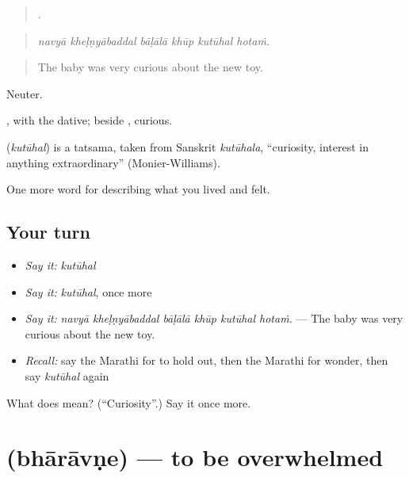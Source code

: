 \begin{quote}
     .
\end{quote}

\begin{quote}
\emph{navyā kheḷṇyābaddal bāḷālā khūp kutūhal hotaṁ.}
\end{quote}

\begin{quote}
The baby was very curious about the new toy.
\end{quote}

Neuter.

 , with the dative; beside , curious.

\begin{cousinweb}
\textbf{} (\emph{kutūhal}) is a tatsama, taken from Sanskrit \emph{kutūhala}, \textquotedblleft{}curiosity, interest in anything extraordinary\textquotedblright{} (Monier-Williams).
\end{cousinweb}

\begin{grammarlens}[title={What you've built}]
One more word for describing what you lived and felt.
\end{grammarlens}

\subsection*{Your turn}
\begin{itemize}
\raggedright
  \item \emph{Say it:} \emph{kutūhal}
  \item \emph{Say it:} \emph{kutūhal}, once more
  \item \emph{Say it:} \emph{navyā kheḷṇyābaddal bāḷālā khūp kutūhal hotaṁ.} — The baby was very curious about the new toy.
  \item \emph{Recall:} say the Marathi for to hold out, then the Marathi for wonder, then say \emph{kutūhal} again
\end{itemize}

\begin{tcolorbox}[breakable,colback=teal!4,colframe=teal!35!black,title={Before you move on}]
What does  mean? (\textquotedblleft{}Curiosity\textquotedblright{}.) Say it once more.
\end{tcolorbox}
\section[\texorpdfstring{\mr{भारावणे} (bhārāvṇe)}{भारावणे (bhārāvṇe)}]{ (bhārāvṇe) — to be overwhelmed}

